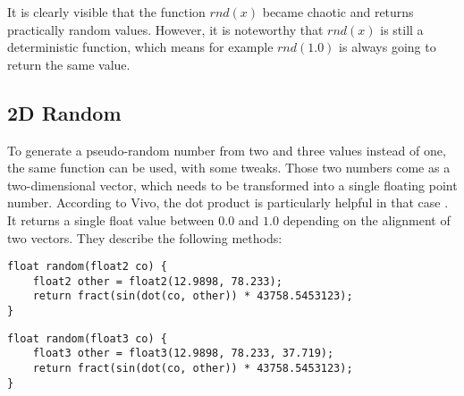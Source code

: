 \begin{figure}[H]
    \centering
\end{figure}

\noindent
It is clearly visible that the function $rnd(x)$ became chaotic and returns practically random values. However, it is noteworthy that $rnd(x)$ is still a deterministic function, which means for example $rnd(1.0)$ is always going to return the same value.

\clearpage
\subsection{2D Random}
To generate a pseudo-random number from two and three values instead of one, the same function can be used, with some tweaks. Those two numbers come as a two-dimensional vector, which needs to be transformed into a single floating point number.
According to Vivo, the dot product is particularly helpful in that case \cite{online:thebookofshaders}. It returns a single float value between $0.0$ and $1.0$ depending on the alignment of two vectors.
They describe the following methods:

\begin{lstlisting}[language=HLSL, caption=Implementation of 2D random number generation., label=lst:random:2d]
float random(float2 co) {
    float2 other = float2(12.9898, 78.233);
    return fract(sin(dot(co, other)) * 43758.5453123);
}
\end{lstlisting}

\begin{lstlisting}[language=HLSL, caption=Implementation of 3D random number generation., label=lst:random:3d]
float random(float3 co) {
    float3 other = float3(12.9898, 78.233, 37.719);
    return fract(sin(dot(co, other)) * 43758.5453123);
}
\end{lstlisting}

